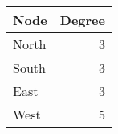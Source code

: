\documentclass[preview, border=2mm]{standalone}
\begin{document}
{\sffamily\everymath{\sf}

\vspace*{\fill}

\begin{table}[h]
\centering
\begin{tabular}{lr}
\toprule
\textbf{Node} & \textbf{Degree} \\
\midrule
North & 3 \\
South & 3 \\
East & 3 \\
West & 5 \\
\bottomrule
\end{tabular}
\end{table}

\vspace*{\fill}

}
\end{document}
